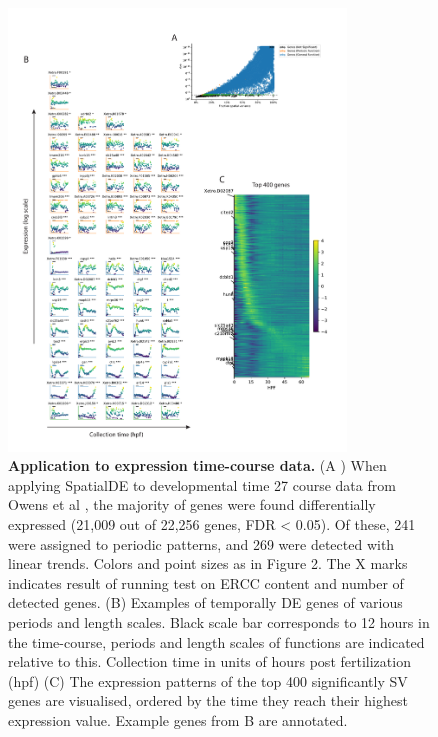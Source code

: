 \begin{figure}
    \centering
    \includegraphics[width=0.8\textwidth]{"SuppFig8"}
    \caption[Application to expression time-course data]{\textbf{Application to expression time-course data.} (A  ) When applying SpatialDE to developmental time 27 course data from Owens et al , the majority of genes were found differentially expressed (21,009 out of 22,256 genes, FDR < 0.05). Of these, 241 were assigned to periodic patterns, and 269 were detected with linear trends. Colors and point sizes as in Figure 2. The X marks indicates result of running test on ERCC content and number of detected genes. (B) Examples of temporally DE genes of various periods and length scales. Black scale bar corresponds to 12 hours in the time-course, periods and length scales of functions are indicated relative to this. Collection time in units of hours post fertilization (hpf) (C) The expression patterns of the top 400 significantly SV genes are visualised, ordered by the time they reach their highest expression value. Example genes from B are annotated.}
    \label{fig:ss8}
\end{figure}

